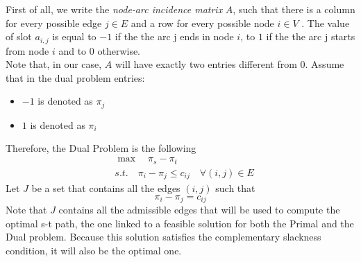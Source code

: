 \documentclass[a4paper,11pt]{article}
\begin{document}
First of all, we write the \textit{node-arc incidence matrix} $A$, such that there is a column for every possible edge $j \in E$ and a row for every possible node  $i \in V$ . The value of slot $a_{i,j}$ is equal to $-1$ if the the arc j ends in node $i$, to $1$ if the the arc j starts from node $i$ and to $0$ otherwise.\\
Note that, in our case, $A$ will have exactly two entries different from $0$. Assume that in the dual problem entries: 
\begin{itemize}
\item
$-1$ is denoted as $\pi_j$
\item 
$1$ is denoted as $\pi_i$
\end{itemize}
Therefore, the Dual Problem is the following
\begin{align*}
	&\max \quad \pi_s - \pi_t\\
	&s.t. \quad \pi_i - \pi_j \le c_{ij} \quad \forall (i,j) \in E
\end{align*}
Let $J$ be a set that contains all the edges $(i,j)$ such that $$\pi_i - \pi_j = c_{ij}$$ 
Note that $J$ contains all the admissible edges that will be used to compute the optimal s-t path, the one linked to a feasible solution for both the Primal and the Dual problem. Because this solution satisfies the complementary slackness condition, it will also be the optimal one. \\
\end{document}
